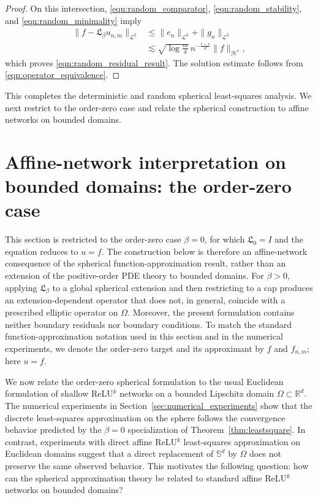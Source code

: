 \documentclass{article}
\numberwithin{equation}{section}
\def\RR{\mathbb{R}}
\def\SS{\mathbb{S}}
\begin{document}
\begin{proof}
On this intersection, \eqref{eqn:random_comparator}, \eqref{eqn:random_stability}, and \eqref{eqn:random_minimality} imply
\begin{equation*}
\begin{split}
\|f-\mathfrak L_\beta u_{n,m}\|_{\mathcal L^2}
&\leq\|e_n\|_{\mathcal L^2}+\|g_n\|_{\mathcal L^2}\\
&\lesssim\sqrt{\log\frac m\delta}\,n^{-\frac{r-\epsilon}{d}}\|f\|_{\mathcal H^r},
\end{split}
\end{equation*}
which proves \eqref{eqn:random_residual_result}. The solution estimate follows from \eqref{eqn:operator_equivalence}.
\end{proof}



This completes the deterministic and random spherical least-squares analysis. We next restrict to the order-zero case and relate the spherical construction to affine networks on bounded domains.

\section{Affine-network interpretation on bounded domains: the order-zero case}
\label{sec_bounded_domain}

This section is restricted to the order-zero case $\beta=0$, for which $\mathfrak L_0=I$ and the equation reduces to $u=f$. The construction below is therefore an affine-network consequence of the spherical function-approximation result, rather than an extension of the positive-order PDE theory to bounded domains. For $\beta>0$, applying $\mathfrak L_\beta$ to a global spherical extension and then restricting to a cap produces an extension-dependent operator that does not, in general, coincide with a prescribed elliptic operator on $\Omega$. Moreover, the present formulation contains neither boundary residuals nor boundary conditions. To match the standard function-approximation notation used in this section and in the numerical experiments, we denote the order-zero target and its approximant by $f$ and $f_{n,m}$; here $u=f$.

We now relate the order-zero spherical formulation to the usual Euclidean formulation of shallow ReLU$^k$ networks on a bounded Lipschitz domain $\Omega\subset\RR^d$. The numerical experiments in Section~\ref{sec:numerical_experiments} show that the discrete least-squares approximation on the sphere follows the convergence behavior predicted by the $\beta=0$ specialization of Theorem~\ref{thm:leastsquare}. In contrast, experiments with direct affine ReLU$^k$ least-squares approximation on Euclidean domains suggest that a direct replacement of $\SS^d$ by $\Omega$ does not preserve the same observed behavior. This motivates the following question: how can the spherical approximation theory be related to standard affine ReLU$^k$ networks on bounded domains?
\end{document}
